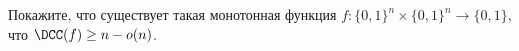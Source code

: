 Покажите, что существует такая монотонная функция $f\colon \{0, 1\}^n \times \{0, 1\}^n \to \{0, 1\}$,
что $\DCC(f) \ge n - o(n)$.
